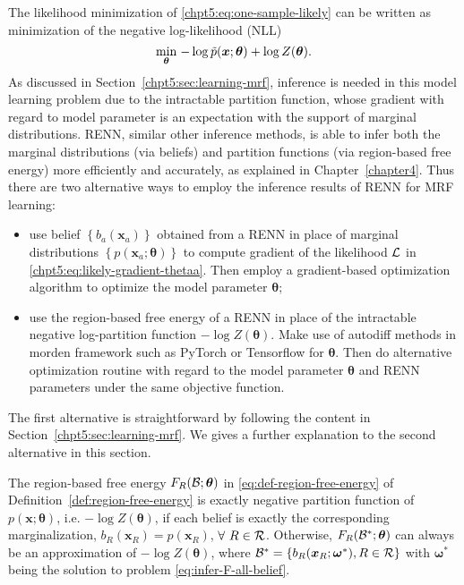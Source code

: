The likelihood minimization of \eqref{chpt5:eq:one-sample-likely} can be written as minimization of the negative log-likelihood (NLL)
\begin{equation}\label{eq:maximizing-likelihood}
  \underset{\bm{\theta}}{\min}\;{ -\log{\tilde{p}(\bm{x}; \bm{\theta})} + \log{Z(\bm{\theta})}}.
\end{equation}
As discussed in Section~\ref{chpt5:sec:learning-mrf}, inference is needed in this model learning problem due to the intractable partition function, whose gradient with regard to model parameter is an expectation with the support of marginal distributions. RENN, similar other inference methods, is able to infer both the marginal distributions (via beliefs) and partition functions (via region-based free energy) more efficiently and accurately, as explained in Chapter~\ref{chapter4}. Thus there are two alternative ways to employ the inference results of RENN for MRF learning:
\begin{itemize}
\item use belief $\left\{ b_{a}(\bm{x}_a) \right\}$ obtained from a RENN in place of marginal distributions $\left\{ p(\bm{x}_a; \bm{\theta}) \right\}$ to compute gradient of the likelihood $\mathcal{L}$ in \eqref{chpt5:eq:likely-gradient-thetaa}. Then employ a gradient-based optimization algorithm to optimize the model parameter $\bm{\theta}$;
  \item use the region-based free energy of a RENN in place of the intractable negative log-partition function $-\log{Z(\bm{\theta})}$. Make use of autodiff methods in morden framework such as PyTorch or Tensorflow for $\bm{\theta}$. Then do alternative optimization routine with regard to the model parameter $\bm{\theta}$ and RENN parameters under the same objective function.
\end{itemize}
The first alternative is straightforward by following the content in Section~\ref{chpt5:sec:learning-mrf}. We gives a further explanation to the second alternative in this section.

The region-based free energy $F_R(\mathcal{B};\bm{\theta})$ in \eqref{eq:def-region-free-energy} of Definition~\ref{def:region-free-energy} is exactly negative partition function of $p(\bm{x};\bm{\theta})$, i.e. $-\log{Z(\bm{\theta})}$, if each belief is exactly the corresponding marginalization, $b_R(\bm{x}_R)=p(\bm{x}_{R})$, $\forall~R\in \mathcal{R}$. Otherwise, $F_R(\mathcal{B}^{\ast};\bm{\theta})$ can always be an approximation of $-\log{Z(\bm{\theta})}$, where $\mathcal{B}^{\ast}= \{b_R(\bm{x}_R; \bm{\omega}^{\ast}), R\in \mathcal{R}\}$ with $\bm{\omega}^{\ast}$ being the solution to problem \eqref{eq:infer-F-all-belief}.

